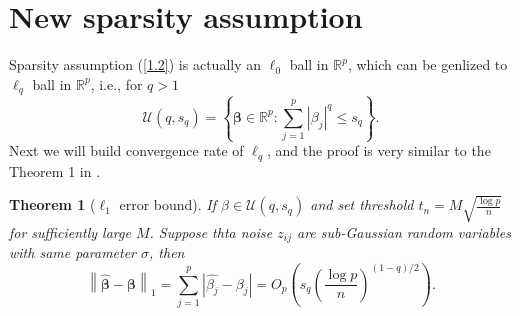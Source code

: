 \documentclass[12pt]{article}
\numberwithin{equation}{section}
\newtheorem{theorem}{Theorem}[section]
\begin{document}
\section{New sparsity assumption}
Sparsity assumption (\ref{1.2}) is actually an $\ell_0$ ball in $\mathbb{R}^p$, which can be genlized to $\ell_q$ ball in $\mathbb{R}^p$, i.e., for $q>1$
\begin{equation}
\mathcal{U}\left(q,s_q\right)=\left\{\boldsymbol{\beta}\in \mathbb{R}^p:\sum_{j=1}^p|\beta_{j}|^q\leq s_q\right\}.
\end{equation}
Next we will build convergence rate of $\ell_q$, and the proof is very similar to the Theorem 1 in \citet{Bickel2008thres}.
\begin{theorem}[$\ell_1$ error bound]
	If $\beta\in \mathcal{U}\left(q,s_q\right)$ and set threshold $t_n=M\sqrt{\frac{\log p}{n}}$ for sufficiently large $M$. Suppose thta noise $z_{ij}$ are sub-Gaussian random variables with same parameter $\sigma$, then
	\begin{equation}\label{3.2}
	\left\|\boldsymbol{\widehat\beta}-\boldsymbol{\beta}\right\|_1=\sum_{j=1}^p|\widehat{\beta_j}-\beta_{j}|=O_p\left(s_q\left(\frac{\log p}{n}\right)^{(1-q)/2}\right).
	\end{equation}
\end{theorem}
\end{document}
